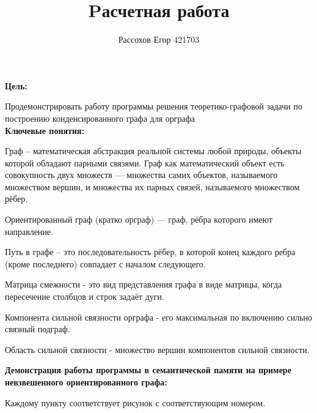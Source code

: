 \documentclass[10pt,a4paper,twocolumn]{article}
\title {\textbf{Pасчетная работа}}
\author{Рассохов Егор 421703}
\date{}
\begin{document}
\maketitle
\large{\hspace{-0.4cm}\textbf{Цель:}}
\par Продемонстрировать работу программы решения теоретико-графовой задачи по построению конденсированного графа для орграфа
\\ \large{\textbf {Ключевые понятия:}}
\par Граф – математическая абстракция реальной системы любой природы, объекты которой обладают парными связями. Граф как математический объект есть совокупность двух множеств — множества самих объектов, называемого множеством вершин, и множества их парных связей, называемого множеством рёбер. 
\par Ориентированный граф (кратко орграф) — граф, рёбра которого имеют направление.
\par Путь в графе – это последовательность рёбер, в которой конец каждого ребра (кроме последнего) совпадает с началом следующего. 
\par Матрица смежности - это вид представления графа в виде матрицы, когда пересечение столбцов и строк задаёт дуги.
\par Компонента сильной связности орграфа - его максимальная по включению сильно связный подграф.
\par Область сильной связности - множество вершин компонентов сильной связности.
\par\large{\hspace{-0.6cm}\textbf{Демонстрация работы программы в семантической памяти на примере невзвешенного ориентированного графа:}}
\par Каждому пункту соответствует рисунок с соответствующим номером.
\end{document}
